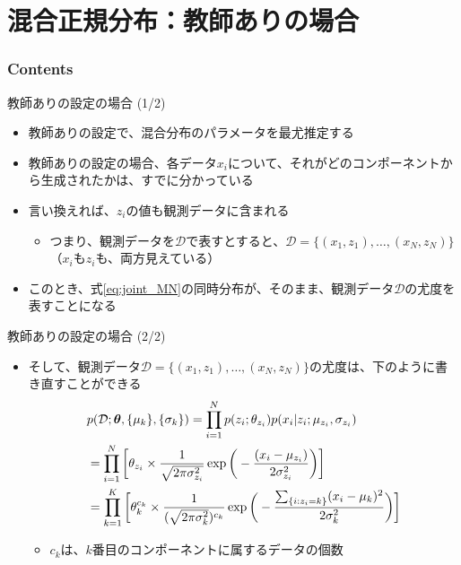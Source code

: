 \documentclass[aspectratio=169,unicode,dvipdfmx,14pt]{beamer}
\begin{document}
\section{混合正規分布：教師ありの場合}

\begin{frame}\frametitle{Contents}
\Large \tableofcontents[currentsection]
\end{frame}


\begin{frame}{教師ありの設定の場合 (1/2)}
\begin{itemize}
\item 教師ありの設定で、混合分布のパラメータを最尤推定する
\item 教師ありの設定の場合、各データ$x_i$について、それがどのコンポーネントから生成されたかは、すでに分かっている
\item 言い換えれば、$z_i$の値も観測データに含まれる
\begin{itemize}
\item つまり、観測データを$\mathcal{D}$で表すとすると、$\mathcal{D} = \{ (x_1,z_1), \ldots, (x_N,z_N) \}$
（$x_i$も$z_i$も、両方見えている）
\end{itemize}
\item このとき、式\eqref{eq:joint_MN}の同時分布が、そのまま、観測データ$\mathcal{D}$の尤度を表すことになる
\end{itemize}
\end{frame}

\begin{frame}{教師ありの設定の場合 (2/2)}
\begin{itemize}
\item そして、観測データ$\mathcal{D} = \{ (x_1,z_1), \ldots, (x_N,z_N) \}$の尤度は、下のように書き直すことができる
\vspace{-.1in}
\begin{align}
& p(\mathcal{D};\bm{\theta}, \{ \mu_k \}, \{ \sigma_k \} )
= \prod_{i=1}^N p(z_i ; \theta_{z_i}) p(x_i | z_i ; \mu_{z_i}, \sigma_{z_i})
\notag \\ &
= \prod_{i=1}^N \bigg[ \theta_{z_i} \times \frac{1}{\sqrt{2\pi\sigma_{z_i}^2}}\exp\bigg( - \frac{(x_i - \mu_{z_i})}{2\sigma_{z_i}^2} \bigg) \bigg]
\notag \\ &
= \prod_{k=1}^K \bigg[ \theta_k^{c_k} \times \frac{1}{ (\sqrt{2\pi\sigma_k^2} )^{c_k}} 
\exp\bigg( - \frac{ \sum_{ \{ i : z_i = k \} } (x_i - \mu_k)^2 }{2\sigma_k^2} \bigg) \bigg]
\label{eq:likelihood_MN}
\end{align}
\vspace{-.15in}
\begin{itemize}
\item $c_k$は、$k$番目のコンポーネントに属するデータの個数
\end{itemize}
\end{itemize}
\end{frame}
\end{document}
